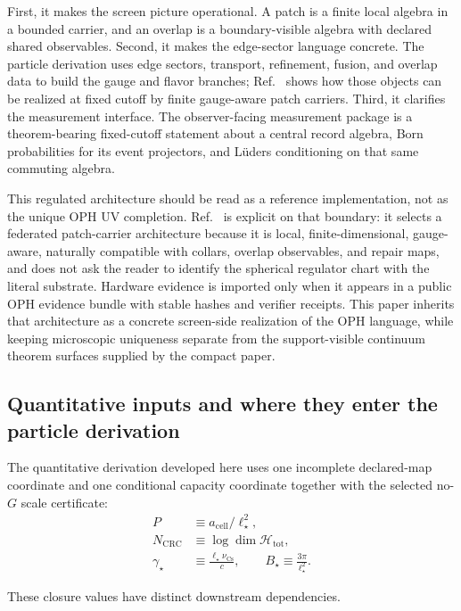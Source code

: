 \documentclass[11pt]{article}
\begin{document}
First, it makes the screen picture operational. A patch is a finite local
algebra in a bounded carrier, and an overlap is a boundary-visible algebra with declared shared
observables. Second, it makes the edge-sector
language concrete. The particle derivation uses edge sectors, transport, refinement,
fusion, and overlap data to build the gauge and flavor branches; Ref.~\cite{ophmicrophysics} shows
how those objects can be realized at fixed cutoff by finite gauge-aware patch carriers.
Third, it clarifies the measurement interface. The observer-facing measurement package is a
theorem-bearing fixed-cutoff statement about a central record algebra, Born probabilities for its
event projectors, and L\"uders conditioning on that same commuting algebra.

This regulated architecture should be read as a reference implementation, not as the unique OPH
UV completion. Ref.~\cite{ophmicrophysics} is explicit on that boundary: it selects a federated
patch-carrier architecture because it is local, finite-dimensional, gauge-aware, naturally
compatible with collars, overlap observables, and repair maps, and does not ask the reader to
identify the spherical regulator chart with the literal substrate. Hardware evidence is imported
only when it appears in a public OPH evidence bundle with stable hashes and verifier receipts.
This paper inherits that architecture as a concrete screen-side realization of the OPH language,
while keeping microscopic uniqueness separate from the support-visible continuum theorem surfaces
supplied by the compact paper.

\subsection{Quantitative inputs and where they enter the particle derivation}

The quantitative derivation developed here uses one incomplete declared-map coordinate and one
conditional capacity coordinate together with the
selected no-\(G\) scale certificate:
\begin{align}
P &\equiv a_{\mathrm{cell}}/\ell_\star^2,\\
N_{\mathrm{CRC}} &\equiv \log \dim \mathcal H_{\mathrm{tot}},\\
\gamma_\star&\equiv\frac{\ell_\star\nu_{\mathrm{Cs}}}{c},
\qquad
B_\star\equiv\frac{3\pi}{\ell_\star^2}.
\end{align}

These closure values have distinct downstream dependencies.
\end{document}
